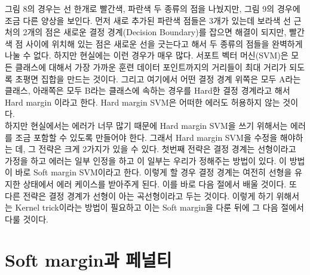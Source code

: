\documentclass[a4paper]{oblivoir}
\begin{document}
\indent 그림 8의 경우는 선 한개로 빨간색, 파란색 두 종류의 점을 나눴지만, 그림 9의 경우에 조금 다른 양상을 보인다. 먼저 새로 추가된 파란색 점들은 3개가 있는데 보라색 선 근처의 2개의 점은 새로운 결정 경계(Decision Boundary)를 잡으면 해결이 되지만, 빨간색 점 사이에 위치해 있는 점은 새로운 선을 긋는다고 해서 두 종류의 점들을 완벽하게 나눌 수 없다. 하지만 현실에는 이런 경우가 매우 많다. 서포트 벡터 머신(SVM)은 모든 클래스에 대해서 가장 가까운 훈련 데이터 포인트까지의 거리들이 최대 거리가 되도록 초평면 집합을 만드는 것이다. 그리고 여기에서 어떤 결정 경계 위쪽은 모두 A라는 클래스, 아래쪽은 모두 B라는 클래스에 속하는 경우를 Hard한 결정 경계라고 해서 Hard margin 이라고 한다. Hard margin SVM은 어떠한 에러도 허용하지 않는 것이다.\\
\indent 하지만 현실에서는 에러가 너무 많기 때문에 Hard margin SVM을 쓰기 위해서는 에러를 조금 포함할 수 있도록 만들어야 한다. 그래서 Hard margin SVM을 수정을 해야하는 데, 그 전략은 크게 2가지가 있을 수 있다. 첫번째 전략은 결정 경계는 선형이라고 가정을 하고 에러는 일부 인정을 하고 이 일부는 우리가 정해주는 방법이 있다. 이 방법이 바로 Soft margin SVM이라고 한다. 이렇게 할 경우 결정 경계는 여전히 선형을 유지한 상태에서 에러 케이스를 받아주게 된다. 이를 바로 다음 절에서 배울 것이다. 또 다른 전략은 결정 경계가 선형이 아는 곡선형이라고 두는 것이다. 이렇게 하기 위해서는 Kernel trick이라는 방법이 필요하고 이는 Soft margin을 다룬 뒤에 그 다음 절에서 다룰 것이다.\\

\section{Soft margin과 페널티}
\end{document}
